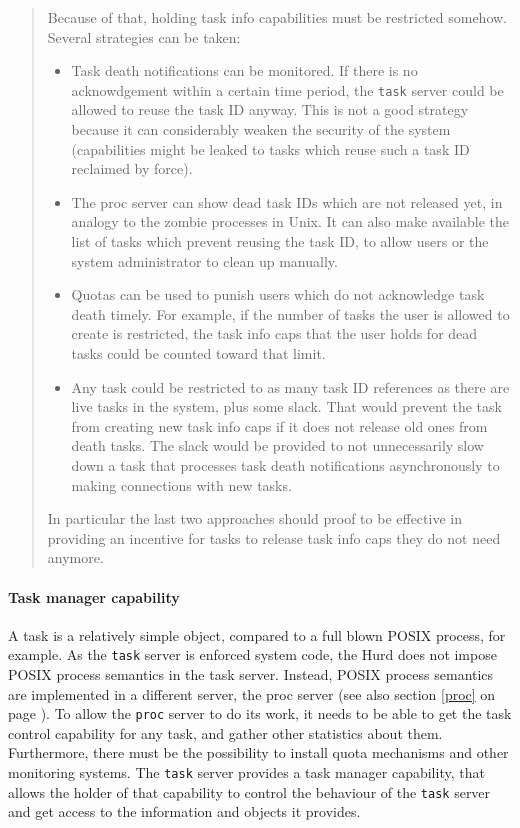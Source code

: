 \documentclass[9pt,a4paper]{extarticle}
\newenvironment{comment}{\footnotesize \begin{quote}}{\end{quote}}
\begin{document}
\begin{comment}
  Because of that, holding task info capabilities must be restricted
  somehow.  Several strategies can be taken:

  \begin{itemize}
  \item Task death notifications can be monitored.  If there is no
    acknowdgement within a certain time period, the \texttt{task}
    server could be allowed to reuse the task ID anyway.  This is not
    a good strategy because it can considerably weaken the security of
    the system (capabilities might be leaked to tasks which reuse such
    a task ID reclaimed by force).
  \item The proc server can show dead task IDs which are not released
    yet, in analogy to the zombie processes in Unix.  It can also make
    available the list of tasks which prevent reusing the task ID, to
    allow users or the system administrator to clean up manually.
  \item Quotas can be used to punish users which do not acknowledge
    task death timely.  For example, if the number of tasks the user
    is allowed to create is restricted, the task info caps that the
    user holds for dead tasks could be counted toward that limit.
  \item Any task could be restricted to as many task ID references as
    there are live tasks in the system, plus some slack.  That would
    prevent the task from creating new task info caps if it does not
    release old ones from death tasks.  The slack would be provided to
    not unnecessarily slow down a task that processes task death
    notifications asynchronously to making connections with new tasks.
  \end{itemize}
  
  In particular the last two approaches should proof to be effective
  in providing an incentive for tasks to release task info caps they
  do not need anymore.
\end{comment}

\paragraph{Task manager capability}
A task is a relatively simple object, compared to a full blown POSIX
process, for example.  As the \texttt{task} server is enforced system
code, the Hurd does not impose POSIX process semantics in the task
server.  Instead, POSIX process semantics are implemented in a
different server, the proc server (see also section \ref{proc} on page
\pageref{proc}).  To allow the \texttt{proc} server to do its work, it
needs to be able to get the task control capability for any task, and
gather other statistics about them.  Furthermore, there must be the
possibility to install quota mechanisms and other monitoring systems.
The \texttt{task} server provides a task manager capability, that
allows the holder of that capability to control the behaviour of the
\texttt{task} server and get access to the information and objects it
provides.
\end{document}
